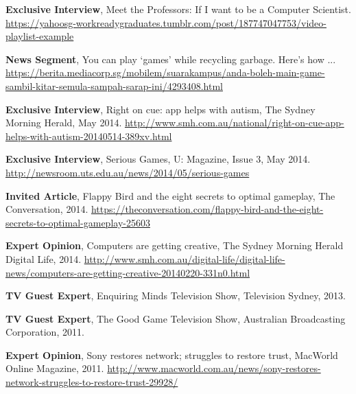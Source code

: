 \documentclass[10pt,a4paper]{article}
\renewenvironment{itemize}{
    \begin{list}{}{
            \setlength{\leftmargin}{1.5em}
            \setlength{\itemsep}{0.25em}
            \setlength{\parskip}{0pt}
            \setlength{\parsep}{0.25em}
        }
        }{
    \end{list}
}
\begin{document}
\begin{itemize}

    \item \textbf{Exclusive Interview}, Meet the Professors: If I want to be a Computer Scientist. \url{https://yahoosg-workreadygraduates.tumblr.com/post/187747047753/video-playlist-example} 

    \item \textbf{News Segment}, You can play `games' while recycling garbage. Here's how ... \url{https://berita.mediacorp.sg/mobilem/suarakampus/anda-boleh-main-game-sambil-kitar-semula-sampah-sarap-ini/4293408.html} 

    \item \textbf{Exclusive Interview}, Right on cue: app helps with autism, The Sydney Morning Herald, May 2014. \url{http://www.smh.com.au/national/right-on-cue-app-helps-with-autism-20140514-389xv.html}

    \item \textbf{Exclusive Interview}, Serious Games, U: Magazine, Issue 3, May 2014. \url{http://newsroom.uts.edu.au/news/2014/05/serious-games}

    \item \textbf{Invited Article}, Flappy Bird and the eight secrets to optimal gameplay, The Conversation, 2014. \url{https://theconversation.com/flappy-bird-and-the-eight-secrets-to-optimal-gameplay-25603}

    \item \textbf{Expert Opinion}, Computers are getting creative, The Sydney Morning Herald Digital Life, 2014. \url{http://www.smh.com.au/digital-life/digital-life-news/computers-are-getting-creative-20140220-331n0.html}

    \item \textbf{TV Guest Expert}, Enquiring Minds Television Show, Television Sydney, 2013.

    \item \textbf{TV Guest Expert}, The Good Game Television Show, Australian Broadcasting Corporation, 2011.

    \item \textbf{Expert Opinion}, Sony restores network; struggles to restore trust, MacWorld Online Magazine, 2011. \url{http://www.macworld.com.au/news/sony-restores-network-struggles-to-restore-trust-29928/}

\end{itemize}


\end{document}
